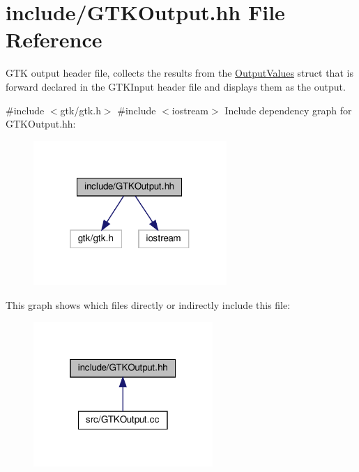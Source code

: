 \hypertarget{GTKOutput_8hh}{}\section{include/\+G\+T\+K\+Output.hh File Reference}
\label{GTKOutput_8hh}


G\+TK output header file, collects the results from the \hyperlink{classOutputValues}{Output\+Values} struct that is forward declared in the G\+T\+K\+Input header file and displays them as the output.  


{\ttfamily \#include $<$gtk/gtk.\+h$>$}\newline
{\ttfamily \#include $<$iostream$>$}\newline
Include dependency graph for G\+T\+K\+Output.\+hh\+:
\nopagebreak
\begin{figure}[H]
\begin{center}
\leavevmode
\includegraphics[width=208pt]{GTKOutput_8hh__incl}
\end{center}
\end{figure}
This graph shows which files directly or indirectly include this file\+:
\nopagebreak
\begin{figure}[H]
\begin{center}
\leavevmode
\includegraphics[width=193pt]{GTKOutput_8hh__dep__incl}
\end{center}
\end{figure}
